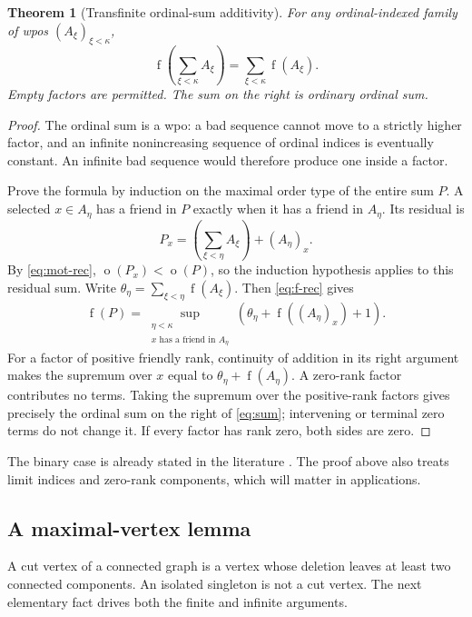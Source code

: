 \documentclass[11pt,a4paper]{article}
\newtheorem{theorem}{Theorem}[section]
\theoremstyle{definition}
\theoremstyle{remark}
\DeclareMathOperator{\mot}{o}
\DeclareMathOperator{\fot}{f}
\begin{document}
\begin{theorem}[Transfinite ordinal-sum additivity]\label{thm:sum}
For any ordinal-indexed family of wpos $(A_\xi)_{\xi<\kappa}$,
\begin{equation}\label{eq:sum}
\fot\left(\sum_{\xi<\kappa}A_\xi\right)
   =\sum_{\xi<\kappa}\fot(A_\xi).
\end{equation}
Empty factors are permitted. The sum on the right is ordinary ordinal sum.
\end{theorem}
\begin{proof}
The ordinal sum is a wpo: a bad sequence cannot move to a strictly higher
factor, and an infinite nonincreasing sequence of ordinal indices is
eventually constant. An infinite bad sequence would therefore produce one
inside a factor.

Prove the formula by induction on the maximal order type of the entire
sum $P$. A selected $x\in A_\eta$ has a friend in $P$ exactly when it has a
friend in $A_\eta$. Its residual is
\[
P_x=\left(\sum_{\xi<\eta}A_\xi\right)+(A_\eta)_x.
\]
By \eqref{eq:mot-rec}, $\mot(P_x)<\mot(P)$, so the induction hypothesis
applies to this residual sum. Write
$\theta_\eta=\sum_{\xi<\eta}\fot(A_\xi)$. Then \eqref{eq:f-rec} gives
\[
\fot(P)=
\sup_{\substack{\eta<\kappa\\x\text{ has a friend in }A_\eta}}
\left(\theta_\eta+\fot((A_\eta)_x)+1\right).
\]
For a factor of positive friendly rank, continuity of addition in its
right argument makes the supremum over $x$ equal to
$\theta_\eta+\fot(A_\eta)$. A zero-rank factor contributes no terms. Taking
the supremum over the positive-rank factors gives precisely the ordinal sum
on the right of \eqref{eq:sum}; intervening or terminal zero terms do not
change it. If every factor has rank zero, both sides are zero.
\end{proof}

The binary case is already stated in the literature
\cite[Proposition~4.1(1)]{Vialard2023}. The proof above also treats limit
indices and zero-rank components, which will matter in applications.

\subsection{A maximal-vertex lemma}

A cut vertex of a connected graph is a vertex whose deletion leaves at
least two connected components. An isolated singleton is not a cut vertex.
The next elementary fact drives both the finite and infinite arguments.
\end{document}
